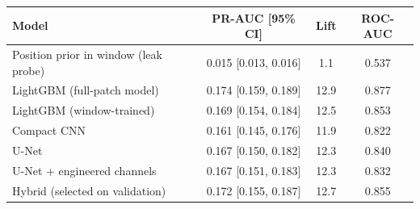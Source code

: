 \begin{tabular}{lccc}
\toprule
Model & PR-AUC [95\% CI] & Lift & ROC-AUC \\
\midrule
Position prior in window (leak probe) & 0.015 [0.013, 0.016] & 1.1 & 0.537 \\
LightGBM (full-patch model) & 0.174 [0.159, 0.189] & 12.9 & 0.877 \\
LightGBM (window-trained) & 0.169 [0.154, 0.184] & 12.5 & 0.853 \\
Compact CNN & 0.161 [0.145, 0.176] & 11.9 & 0.822 \\
U-Net & 0.167 [0.150, 0.182] & 12.3 & 0.840 \\
U-Net + engineered channels & 0.167 [0.151, 0.183] & 12.3 & 0.832 \\
Hybrid (selected on validation) & 0.172 [0.155, 0.187] & 12.7 & 0.855 \\
\bottomrule
\end{tabular}
